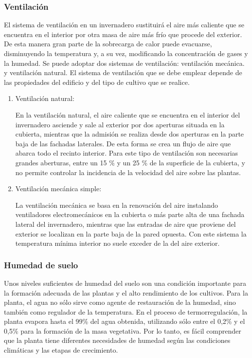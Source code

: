 \subsubsection{Ventilación}
El sistema de ventilación en un invernadero sustituirá el aire más caliente que
se encuentra en el interior por otra masa de aire más frío que procede del
exterior. De esta manera gran parte de la sobrecarga de calor puede evacuarse,
disminuyendo la temperatura y, a su vez, modificando la concentración de gases
y la humedad. Se puede adoptar dos sistemas de ventilación: ventilación
mecánica. y ventilación natural. El sistema de ventilación que se debe emplear
depende de las propiedades del edificio y del tipo de cultivo que se realice.

\begin{enumerate}
    \item Ventilación natural:

        En la ventilación natural, el aire caliente que se encuentra en el
        interior del invernadero asciende y sale al exterior por dos aperturas
        situada en la cubierta, mientras que la admisión se realiza desde dos
        aperturas en la parte baja de las fachadas laterales. De esta forma se
        crea un flujo de aire que abarca todo el recinto interior. Para este
        tipo de ventilación son necesarias grandes aberturas, entre un 15 \% y
        un 25 \% de la superficie de la cubierta, y no permite controlar la
        incidencia de la velocidad del aire sobre las plantas.
    \item Ventilación mecánica simple:

        La ventilación mecánica se basa en la renovación del aire instalando
        ventiladores electromecánicos en la cubierta o más parte alta de una
        fachada lateral del invernadero, mientras que las entradas de aire que
       proviene del exterior se localizan en la parte baja de la pared
        opuesta.  Con este sistema la temperatura mínima interior no suele
        exceder de la del aire exterior.  

\end{enumerate}
\subsubsection{Humedad de suelo}
Unos niveles suficientes de humedad del suelo son una condición importante para
la formación adecuada de las plantas y el alto rendimiento de los cultivos.
Para la planta, el agua no sólo sirve como agente de restauración de la
humedad, sino también como regulador de la temperatura. En el proceso de
termorregulación, la planta evapora hasta el 99\% del agua obtenida, utilizando
sólo entre el 0,2\% y el 0,5\% para la formación de la masa vegetativa. Por lo
tanto, es fácil comprender que la planta tiene diferentes necesidades de
humedad según las condiciones climáticas y las etapas de crecimiento.
